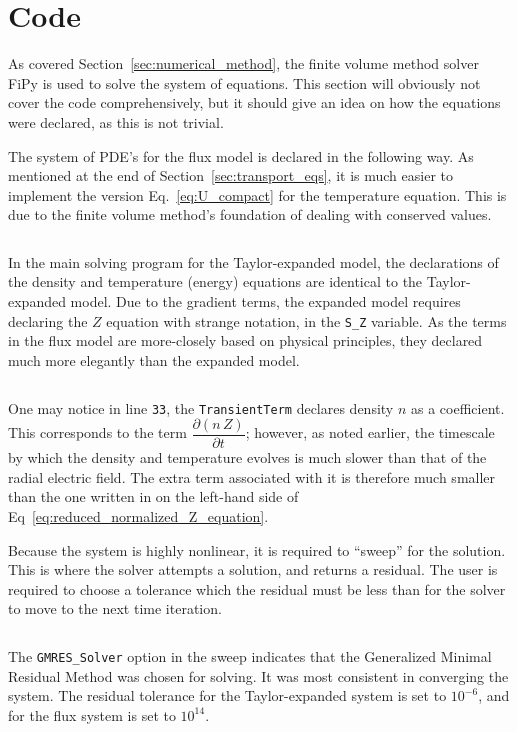 \chapter{Code}\label{chapter:Code}
As covered Section~\ref{sec:numerical_method}, the finite volume method solver FiPy \cite{guyer_fipy:_2009} is used to solve the system of equations.
This section will obviously not cover the code comprehensively, but it should give an idea on how the equations were declared, as this is not trivial.

The system of PDE's for the flux model is declared in the following way.
As mentioned at the end of Section~\ref{sec:transport_eqs}, it is much easier to implement the version Eq.~\ref{eq:U_compact} for the temperature equation.
This is due to the finite volume method's foundation of dealing with conserved values.
\inputminted[firstline=22, lastline=42, tabsize=4, breaklines=true, fontsize=\footnotesize, frame=single, linenos=true]{python}{../FiPy_Model/solving_flux.py}

In the main solving program for the Taylor-expanded model, the declarations of the density and temperature (energy) equations are identical to the Taylor-expanded model.
Due to the gradient terms, the expanded model requires declaring the $Z$ equation with strange notation, in the \texttt{S_Z} variable.
As the terms in the flux model are more-closely based on physical principles, they declared much more elegantly than the expanded model.
\inputminted[firstline=32, lastline=37, tabsize=4, breaklines=true, fontsize=\footnotesize, frame=single, linenos=true]{python}{../FiPy_Model/solving_original.py}

One may notice in line \texttt{33}, the \texttt{TransientTerm} declares density $n$ as a coefficient.
This corresponds to the term $\dfrac{\partial (n \, Z)}{\partial t}$; however, as noted earlier, the timescale by which the density and temperature evolves is much slower than that of the radial electric field.
The extra term associated with it is therefore much smaller than the one written in on the left-hand side of Eq~\ref{eq:reduced_normalized_Z_equation}.

Because the system is highly nonlinear, it is required to ``sweep'' for the solution.
This is where the solver attempts a solution, and returns a residual.
The user is required to choose a tolerance which the residual must be less than for the solver to move to the next time iteration.
\inputminted[firstline=98, lastline=112, tabsize=4, breaklines=true, fontsize=\footnotesize, frame=single, linenos=true]{python}{../FiPy_Model/solving_flux.py}

The \texttt{GMRES_Solver} option in the sweep indicates that the Generalized Minimal Residual Method was chosen for solving.
It was most consistent in converging the system.
The residual tolerance for the Taylor-expanded system is set to $10^{-6}$, and for the flux system is set to $10^{14}$.

